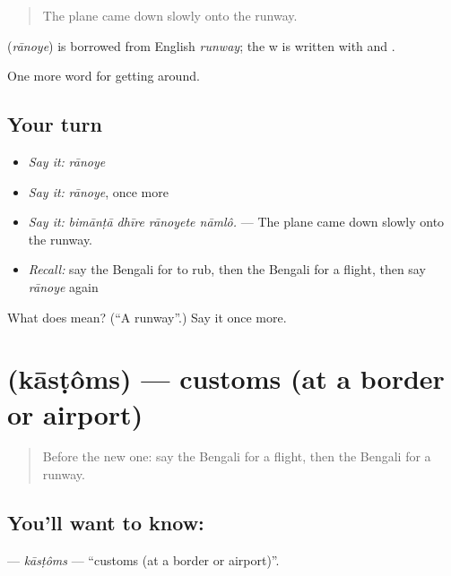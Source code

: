 \begin{quote}
The plane came down slowly onto the runway.
\end{quote}

\begin{cousinweb}
\textbf{} (\emph{rānoye}) is borrowed from English \emph{runway}; the w is written with  and .
\end{cousinweb}

\begin{grammarlens}[title={What you've built}]
One more word for getting around.
\end{grammarlens}

\subsection*{Your turn}
\begin{itemize}
\raggedright
  \item \emph{Say it:} \emph{rānoye}
  \item \emph{Say it:} \emph{rānoye}, once more
  \item \emph{Say it:} \emph{bimānṭā dhīre rānoyete nāmlô.} — The plane came down slowly onto the runway.
  \item \emph{Recall:} say the Bengali for to rub, then the Bengali for a flight, then say \emph{rānoye} again
\end{itemize}

\begin{tcolorbox}[breakable,colback=teal!4,colframe=teal!35!black,title={Before you move on}]
What does  mean? (\textquotedblleft{}A runway\textquotedblright{}.) Say it once more.
\end{tcolorbox}
\section[\texorpdfstring{\bn{কাস্টমস} (kāsṭôms)}{কাস্টমস (kāsṭôms)}]{ (kāsṭôms) — customs (at a border or airport)}

\label{lesson:BN-C395-kastoms}



\begin{quote}
Before the new one: say the Bengali for a flight, then the Bengali for a runway.
\end{quote}

\subsection*{You'll want to know: }
\textbf{} — \emph{kāsṭôms} — \textquotedblleft{}customs (at a border or airport)\textquotedblright{}.

